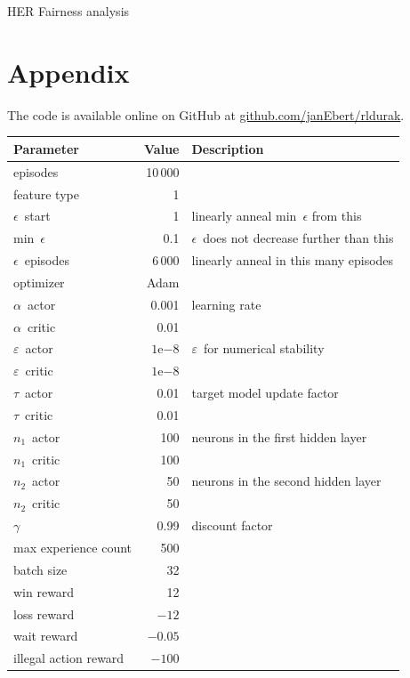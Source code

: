 \documentclass[a4paper,titlepage]{article}
\newcommand{\expn}[2]{{#1}\mathrm{e}{#2}}
\begin{document}
HER \cite{her}
Fairness analysis

\newpage

\section{Appendix}
\label{sec:appendix}

The code is available online on GitHub at \url{github.com/janEbert/rldurak}. \bigskip

\begin{table}[h]
\centering
  \begin{tabular}{lrl}
    \toprule
    Parameter & Value & Description \\
    \midrule
    episodes & 10\,000 \\
    feature type & 1 \\
    $\epsilon$~start & 1 & linearly anneal min~$\epsilon$ from this\\
    min~$\epsilon$ & 0.1 & $\epsilon$~does not decrease further than this \\
    $\epsilon$~episodes & 6\,000 & linearly anneal in this many episodes \\
    optimizer & Adam \\
    $\alpha$~actor & 0.001 & learning rate \\
    $\alpha$~critic & 0.01 \\
    $\varepsilon$~actor & $\expn{1}{-8}$ & $\varepsilon$~for numerical stability \\
    $\varepsilon$~critic & $\expn{1}{-8}$ \\
    $\tau$~actor & 0.01 & target model update factor \\
    $\tau$~critic & 0.01 \\
    $n_1$~actor & 100 & neurons in the first hidden layer \\
    $n_1$~critic & 100 \\
    $n_2$~actor & 50 & neurons in the second hidden layer \\
    $n_2$~critic & 50 \\
    $\gamma$ & 0.99 & discount factor \\
    max experience count & 500 \\
    batch size & 32 \\
    win reward & 12 \\
    loss reward & $-12$ \\
    wait reward & $-0.05$ \\
    illegal action reward & $-100$ \\

\end{tabular}
\end{table}
\end{document}
